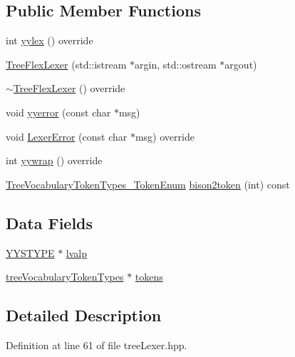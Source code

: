 \subsection*{Public Member Functions}
\begin{DoxyCompactItemize}
\item 
int \hyperlink{structTreeFlexLexer_a3853cf6be8499de76166b76e7257975d}{yylex} () override
\item 
\hyperlink{structTreeFlexLexer_ac0c0f62e3a211da011dfdaeaf901a433}{Tree\+Flex\+Lexer} (std\+::istream $\ast$argin, std\+::ostream $\ast$argout)
\item 
\hyperlink{structTreeFlexLexer_a2d37f5ef0de96df208789f90fc42be91}{$\sim$\+Tree\+Flex\+Lexer} () override
\item 
void \hyperlink{structTreeFlexLexer_a71d99188f7a9917d25163f47743a8a44}{yyerror} (const char $\ast$msg)
\item 
void \hyperlink{structTreeFlexLexer_a29c958363809be1af8fd3ba2fd8da884}{Lexer\+Error} (const char $\ast$msg) override
\item 
int \hyperlink{structTreeFlexLexer_a0c480d7a6b1104d8a863792b911f7253}{yywrap} () override
\item 
\hyperlink{token__interface_8hpp_a14502d0757789149f644966ca931b126}{Tree\+Vocabulary\+Token\+Types\+\_\+\+Token\+Enum} \hyperlink{structTreeFlexLexer_a95439c970bf3893bd8819eef2721aae9}{bison2token} (int) const
\end{DoxyCompactItemize}
\subsection*{Data Fields}
\begin{DoxyCompactItemize}
\item 
\hyperlink{asn__parser_8cpp_a2ceb5b985e149f18e018b142cfdd7264}{Y\+Y\+S\+T\+Y\+PE} $\ast$ \hyperlink{structTreeFlexLexer_ac91928069e90985339397a2c2f3f63a9}{lvalp}
\item 
\hyperlink{structtreeVocabularyTokenTypes}{tree\+Vocabulary\+Token\+Types} $\ast$ \hyperlink{structTreeFlexLexer_a89c980bec1bdd735a1ec392084dac4d6}{tokens}
\end{DoxyCompactItemize}


\subsection{Detailed Description}


Definition at line 61 of file tree\+Lexer.\+hpp.



